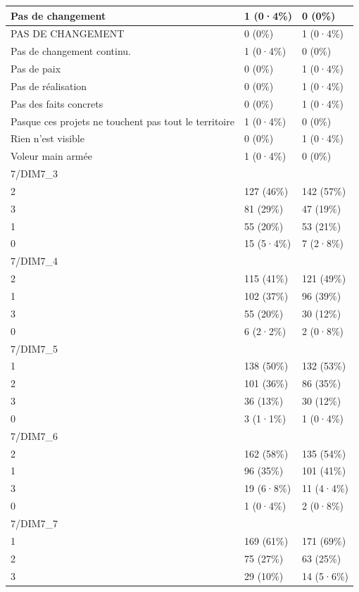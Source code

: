 \documentclass[
]{book}
\begin{document}
\begin{tabular}{l|l|l}
\hline
Pas de changement & 1 (0·4\%) & 0 (0\%)\\
\hline
PAS DE CHANGEMENT & 0 (0\%) & 1 (0·4\%)\\
\hline
Pas de changement continu. & 1 (0·4\%) & 0 (0\%)\\
\hline
Pas de paix & 0 (0\%) & 1 (0·4\%)\\
\hline
Pas de réalisation & 0 (0\%) & 1 (0·4\%)\\
\hline
Pas des faits concrets & 0 (0\%) & 1 (0·4\%)\\
\hline
Pasque ces projets ne touchent pas tout le territoire & 1 (0·4\%) & 0 (0\%)\\
\hline
Rien n'est visible & 0 (0\%) & 1 (0·4\%)\\
\hline
Voleur main armée & 1 (0·4\%) & 0 (0\%)\\
\hline
7/DIM7\_3 &  & \\
\hline
2 & 127 (46\%) & 142 (57\%)\\
\hline
3 & 81 (29\%) & 47 (19\%)\\
\hline
1 & 55 (20\%) & 53 (21\%)\\
\hline
0 & 15 (5·4\%) & 7 (2·8\%)\\
\hline
7/DIM7\_4 &  & \\
\hline
2 & 115 (41\%) & 121 (49\%)\\
\hline
1 & 102 (37\%) & 96 (39\%)\\
\hline
3 & 55 (20\%) & 30 (12\%)\\
\hline
0 & 6 (2·2\%) & 2 (0·8\%)\\
\hline
7/DIM7\_5 &  & \\
\hline
1 & 138 (50\%) & 132 (53\%)\\
\hline
2 & 101 (36\%) & 86 (35\%)\\
\hline
3 & 36 (13\%) & 30 (12\%)\\
\hline
0 & 3 (1·1\%) & 1 (0·4\%)\\
\hline
7/DIM7\_6 &  & \\
\hline
2 & 162 (58\%) & 135 (54\%)\\
\hline
1 & 96 (35\%) & 101 (41\%)\\
\hline
3 & 19 (6·8\%) & 11 (4·4\%)\\
\hline
0 & 1 (0·4\%) & 2 (0·8\%)\\
\hline
7/DIM7\_7 &  & \\
\hline
1 & 169 (61\%) & 171 (69\%)\\
\hline
2 & 75 (27\%) & 63 (25\%)\\
\hline
3 & 29 (10\%) & 14 (5·6\%)\\

\end{tabular}
\end{document}
